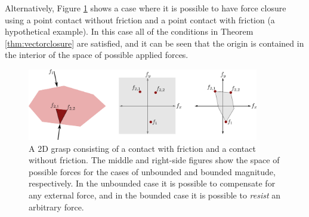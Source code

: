 \begin{example}
Alternatively, Figure \ref{fig:2dgrasp_forces_b} shows a case where it is possible to have force closure using a point contact without friction and a point contact with friction (a hypothetical example). In this case all of the conditions in Theorem \ref{thm:vectorclosure} are satisfied, and it can be seen that the origin is contained in the interior of the space of possible applied forces.
\begin{figure}[ht]
\begin{center}
\includegraphics[width=0.9\textwidth]{tex/figs/ch26_figs/2Dexample_forces_b.png}
\caption{A 2D grasp consisting of a contact with friction and a contact without friction. The middle and right-side figures show the space of possible forces for the cases of unbounded and bounded magnitude, respectively. In the unbounded case it is possible to compensate for any external force, and in the bounded case it is possible to \textit{resist} an arbitrary force.}
\label{fig:2dgrasp_forces_b}
\end{center}
\end{figure}
\end{example}

